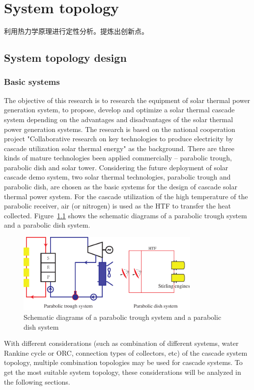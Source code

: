 \chapter{System topology}
利用热力学原理进行定性分析。提炼出创新点。
\section{System topology design}
\subsection{Basic systems}

The objective of this research is to research the equipment of solar thermal power generation system, to propose, develop and optimize a solar thermal cascade system depending on the advantages and disadvantages of the solar thermal power generation systems. 
The research is based on the national cooperation project "Collaborative research on key technologies to produce electricity by cascade utilization solar thermal energy" as the background. 
There are three kinds of mature technologies been applied commercially -- parabolic trough, parabolic dish and solar tower. 
Considering the future deployment of solar cascade demo system, two solar thermal technologies, parabolic trough and parabolic dish, are chosen as the basic systems for the design of cascade solar thermal power system. For the cascade utilization of the high temperature of the parabolic receiver, air (or nitrogen) is used as the HTF to transfer the heat collected.
Figure~\ref{fig:PTPD} shows the schematic diagrams of a parabolic trough system and a parabolic dish system.

\begin{figure}[!ht]
\centering
\includegraphics[width=0.8\textwidth]{fig/PTPD.pdf}
\caption{Schematic diagrams of a parabolic trough system and a parabolic dish system}\label{fig:PTPD}
\end{figure}

With different considerations (such as combination of different systems, water Rankine cycle or ORC, connection types of collectors, etc) of the cascade system topology, multiple combination topologies may be used for cascade systems. To get the most suitable system topology, these considerations will be analyzed in the following sections. 

